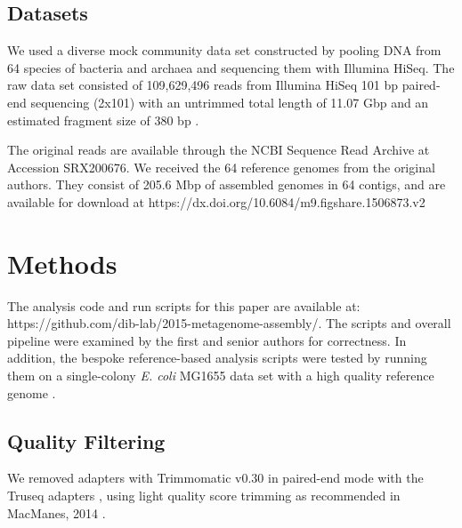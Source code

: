 \documentclass[10pt,a4paper,twocolumn]{article}
\begin{document}
 

\subsection*{Datasets}

We used a diverse mock community data set constructed by pooling DNA
from 64 species of bacteria and archaea and sequencing them with
Illumina HiSeq.  The raw data set consisted of 109,629,496 reads from
Illumina HiSeq 101 bp paired-end sequencing (2x101) with an untrimmed
total length of 11.07 Gbp and an estimated fragment size of 380 bp
\cite{podar}.
 
The original reads are available through the NCBI Sequence Read
Archive at Accession SRX200676.
We received the 64 reference genomes from the original authors. They
consist of 205.6 Mbp of assembled genomes in 64 contigs, and are
available for download at
https://dx.doi.org/10.6084/m9.figshare.1506873.v2

\section*{Methods}
The analysis code and run scripts for this paper are available at:
https://github.com/dib-lab/2015-metagenome-assembly/. The scripts and
overall pipeline were examined by the first and senior authors for
correctness.  In addition, the bespoke reference-based analysis
scripts were tested by running them on a single-colony {\em E. coli} MG1655
data set with a high quality reference genome \cite{chitsaz2011}.

\subsection*{Quality Filtering} 

We removed adapters with Trimmomatic v0.30 in paired-end mode with the
Truseq adapters \cite{trimmomatic}, using light quality score trimming
as recommended in MacManes, 2014 \cite{macmanes2014optimal}.

\end{document}
